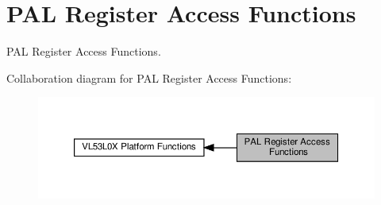 \hypertarget{group__VL53L0X__registerAccess__group}{}\section{P\+AL Register Access Functions}
\label{group__VL53L0X__registerAccess__group}


P\+AL Register Access Functions.  


Collaboration diagram for P\+AL Register Access Functions\+:\nopagebreak
\begin{figure}[H]
\begin{center}
\leavevmode
\includegraphics[width=350pt]{group__VL53L0X__registerAccess__group}
\end{center}
\end{figure}

